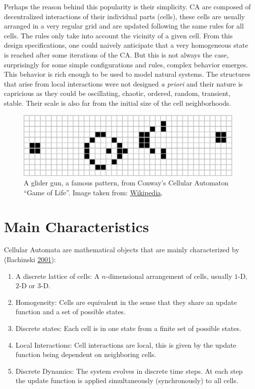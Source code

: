 \documentclass[
  12pt,
  openany]{book}
\begin{document}
Perhaps the reason behind this popularity is their simplicity. CA are composed of decentralized interactions of their individual parts (cells), these cells are usually arranged in a very regular grid and are updated following the same rules for all cells. The rules only take into account the vicinity of a given cell. From this design specifications, one could naively anticipate that a very homogeneous state is reached after some iterations of the CA. But this is not always the case, surprisingly for some simple configurations and rules, complex behavior emerges. This behavior is rich enough to be used to model natural systems. The structures that arise from local interactions were not designed \emph{a priori} and their nature is capricious as they could be oscillating, chaotic, ordered, random, transient, stable. Their scale is also far from the initial size of the cell neighborhoods.



\begin{figure}

{\centering \includegraphics[width=0.8\linewidth]{pics/Game_of_life_glider_gun} 

}

\caption{A glider gun, a famous pattern, from Conway's Cellular Automaton ``Game of Life''. Image taken from: \href{https://en.wikipedia.org/wiki/File:Game_of_life_glider_gun.svg}{Wikipedia}.}\label{fig:CA-example}
\end{figure}

\hypertarget{main-characteristics}{%
\section{Main Characteristics}\label{main-characteristics}}

Cellular Automata are mathematical objects that are mainly characterized by (Ilachinski \protect\hyperlink{ref-ilachinski2001cellular}{2001}):

\begin{enumerate}
\def\labelenumi{\arabic{enumi}.}
\item
  A discrete lattice of cells:
  A \(n\)-dimensional arrangement of cells, usually \(1\)-D, \(2\)-D or \(3\)-D.
\item
  Homogeneity:
  Cells are equivalent in the sense that they share an update function and a set of possible states.
\item
  Discrete states:
  Each cell is in one state from a finite set of possible states.
\item
  Local Interactions:
  Cell interactions are local, this is given by the update function being dependent on neighboring cells.
\item
  Discrete Dynamics:
  The system evolves in discrete time steps. At each step the update function is applied simultaneously (synchronously) to all cells.
\end{enumerate}
\end{document}
